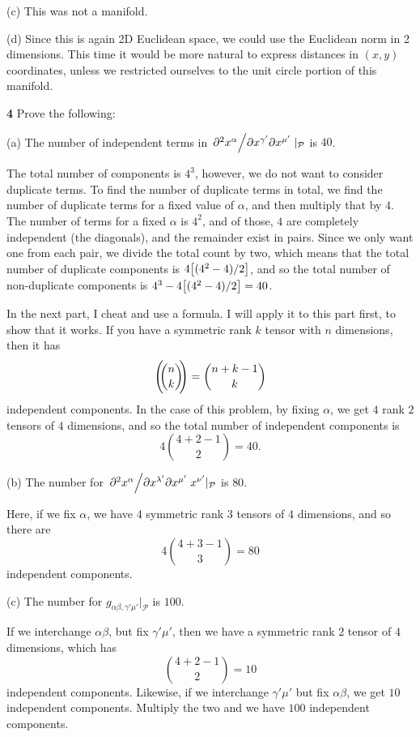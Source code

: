 \documentclass[gr-notes.tex]{subfiles}
\begin{document}
(c) This was not a manifold.

(d) Since this is again 2D Euclidean space, we could use the Euclidean norm in 2 dimensions. This time it would be more natural to express distances in $(x,y)$ coordinates, unless we restricted ourselves to the unit circle portion of this manifold.



\textbf{4}
Prove the following:

(a) The number of independent terms in $\pdv*{x^\alpha}{x^{\gamma'}}{x^{\mu'}}|_\mathcal{P}$ is $40$.

The total number of components is $4^3$, however, we do not want to consider duplicate terms. To find the number of duplicate terms in total, we find the number of duplicate terms for a fixed value of $\alpha$, and then multiply that by $4$. The number of terms for a fixed $\alpha$ is $4^2$, and of those, $4$ are completely independent (the diagonals), and the remainder exist in pairs. Since we only want one from each pair, we divide the total count by two, which means that the total number of duplicate components is $4 \qty[ (4^2 - 4) / 2 ]$, and so the total number of non-duplicate components is $4^3 - 4 \qty[ (4^2 - 4) / 2 ] = 40$.

In the next part, I cheat and use a formula. I will apply it to this part first, to show that it works. If you have a symmetric rank $k$ tensor with $n$ dimensions, then it has
%
\begin{displaymath}
  \qty(\!\!\binom{n}{k}\!\!) = \binom{n+k-1}{k}
\end{displaymath}
%
independent components. In the case of this problem, by fixing $\alpha$, we get $4$ rank $2$ tensors of $4$ dimensions, and so the total number of independent components is
%
\begin{displaymath}
  4 \binom{4+2-1}{2} = 40.
\end{displaymath}


(b) The number for $\pdv*{x^\alpha}{x^{\lambda'}}{x^{\mu'}}{x^{\nu'}}|_\mathcal{P}$ is $80$.

Here, if we fix $\alpha$, we have $4$ symmetric rank $3$ tensors of $4$ dimensions, and so there are
%
\begin{displaymath}
  4 \binom{4+3-1}{3} = 80
\end{displaymath}
%
independent components.


(c) The number for $g_{\alpha\beta,\gamma'\mu'}|_\mathcal{P}$ is $100$.

If we interchange $\alpha\beta$, but fix $\gamma'\mu'$, then we have a symmetric rank $2$ tensor of $4$ dimensions, which has
%
\begin{displaymath}
  \binom{4+2-1}{2} = 10
\end{displaymath}
%
independent components. Likewise, if we interchange $\gamma'\mu'$ but fix $\alpha\beta$, we get $10$ independent components. Multiply the two and we have $100$ independent components.
\end{document}
